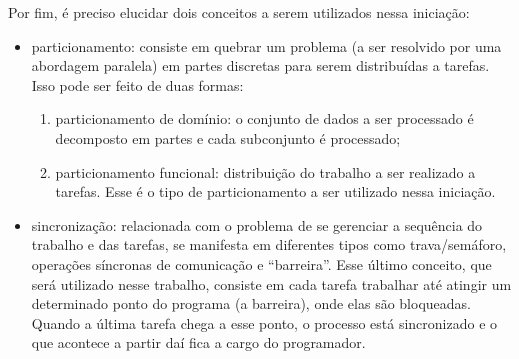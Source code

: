 		Por fim, é preciso elucidar dois conceitos a serem utilizados nessa 
		iniciação:
        \begin{itemize}
           	\item particionamento: consiste em quebrar um problema (a ser resolvido por uma abordagem paralela) em partes discretas para 
           	serem distribuídas a tarefas. Isso pode ser feito de duas formas: \begin{enumerate}
           		\item particionamento de domínio: o conjunto de dados a ser 
           		processado é decomposto em partes e cada subconjunto é 
           		processado;
           		
           		\item particionamento funcional: distribuição do trabalho a 
           		ser realizado a tarefas. Esse é o tipo de particionamento a 
           		ser utilizado nessa iniciação.
           	\end{enumerate}
           	
           	\item sincronização: relacionada com o problema de se gerenciar 
           	a sequência do trabalho e das tarefas, se manifesta em diferentes 
           	tipos como trava/semáforo, operações síncronas de comunicação e 
           	``barreira''. Esse último conceito, que será utilizado nesse 
           	trabalho, consiste em cada tarefa trabalhar até atingir um 
           	determinado ponto do programa (a barreira), onde elas são 
           	bloqueadas. Quando a última tarefa chega a esse ponto, o processo 
           	está sincronizado e o que acontece a partir daí fica a cargo do 
           	programador.
        \end{itemize}